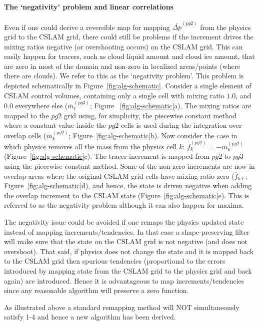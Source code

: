 \documentclass{agujournal}
\begin{document}
\paragraph{The `negativity' problem and linear correlations} 
Even if one could derive a reversible map for mapping ${\overline{\Delta p}}^{(pg2)}$ from the physics grid to the CSLAM grid, there could still be problems if the increment drives the mixing ratios negative (or overshooting occurs) on the CSLAM grid. This can easily happen for tracers, such as cloud liquid amount and cloud ice amount, that are zero in most of the domain and non-zero in localized areas/points (where there are clouds). We refer to this as the `negativity problem'. This problem is depicted schematically in Figure~\ref{fig:alg-schematic}. Consider a single element of CSLAM control volumes, containing only a single cell with mixing ratio $1.0$, and $0.0$ everywhere else ($\overline{m}^{(pg3)}_\ell$; Figure ~\ref{fig:alg-schematic}a). The mixing ratios are mapped to the $pg2$ grid using, for simplicity, the piecewise constant method where a constant value inside the $pg2$ cells is used during the integration over overlap cells ($\overline{m}^{(pg2)}_k$; Figure~\ref{fig:alg-schematic}b). Now consider the case in which physics removes all the mass from the physics cell $k$: $\overline{f}^{(pg2)}_k=-\overline{m}^{(pg2)}_k$ (Figure~\ref{fig:alg-schematic}c). The tracer increment is mapped from $pg2$ to $pg3$ using the piecewise constant method. Some of the non-zero increments are now in overlap areas where the original CSLAM grid cells have mixing ratio zero ($\overline{f}_{k\ell}$; Figure~\ref{fig:alg-schematic}d), and hence, the state is driven negative when adding the overlap increment to the CSLAM state (Figure~\ref{fig:alg-schematic}e).  This is referred to as the negativity problem although it can also happen for maxima.

The negativity issue could be avoided if one remaps the physics updated state instead of mapping increments/tendencies. In that case a shape-preserving filter will make sure that the state on the CSLAM grid is not negative (and does not overshoot). That said, if physics does not change the state and it is mapped back to the CSLAM grid then spurious tendencies (proportional to the errors introduced by mapping state from the CSLAM grid to the physics grid and back again) are introduced. Hence it is advantageous to map increments/tendencies since any reasonable algorithm will preserve a zero function.

As illustrated above a standard remapping method will NOT simultaneously satisfy 1-4 and hence a new algorithm has been derived.
\end{document}
